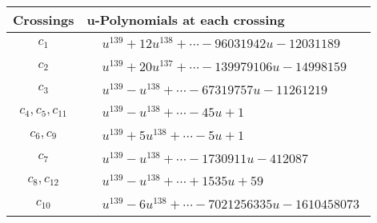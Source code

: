 \documentclass[1p]{elsarticle_modified}
\theoremstyle{definition}
\begin{document}
\begin{tabular}{m{50pt}|m{274pt}}
Crossings & \hspace{64pt}u-Polynomials at each crossing \\
\hline $$\begin{aligned}c_{1}\end{aligned}$$&$\begin{aligned}
&u^{139}+12 u^{138}+\cdots-96031942 u-12031189
\end{aligned}$\\
\hline $$\begin{aligned}c_{2}\end{aligned}$$&$\begin{aligned}
&u^{139}+20 u^{137}+\cdots-139979106 u-14998159
\end{aligned}$\\
\hline $$\begin{aligned}c_{3}\end{aligned}$$&$\begin{aligned}
&u^{139}- u^{138}+\cdots-67319757 u-11261219
\end{aligned}$\\
\hline $$\begin{aligned}c_{4},c_{5},c_{11}\end{aligned}$$&$\begin{aligned}
&u^{139}- u^{138}+\cdots-45 u+1
\end{aligned}$\\
\hline $$\begin{aligned}c_{6},c_{9}\end{aligned}$$&$\begin{aligned}
&u^{139}+5 u^{138}+\cdots-5 u+1
\end{aligned}$\\
\hline $$\begin{aligned}c_{7}\end{aligned}$$&$\begin{aligned}
&u^{139}- u^{138}+\cdots-1730911 u-412087
\end{aligned}$\\
\hline $$\begin{aligned}c_{8},c_{12}\end{aligned}$$&$\begin{aligned}
&u^{139}- u^{138}+\cdots+1535 u+59
\end{aligned}$\\
\hline $$\begin{aligned}c_{10}\end{aligned}$$&$\begin{aligned}
&u^{139}-6 u^{138}+\cdots-7021256335 u-1610458073
\end{aligned}$\\
\hline
\end{tabular}\\~\\
\end{document}
